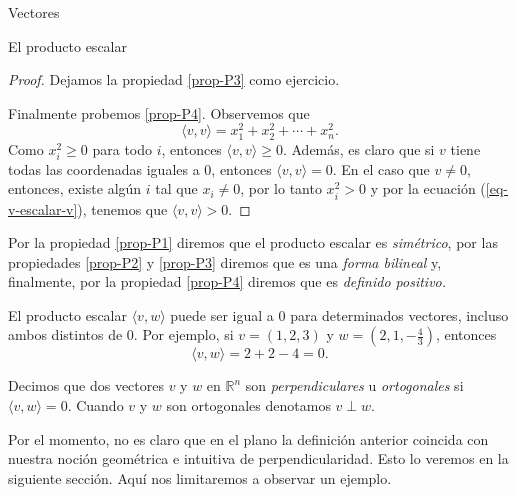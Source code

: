 \begin{chapter}{Vectores}
\begin{section}{El producto escalar}
\begin{proof}
        Dejamos la propiedad \ref{prop-P3} como ejercicio.
        
        Finalmente probemos \ref{prop-P4}. Observemos que 
        \begin{equation}\label{eq-v-escalar-v}
            \langle v , v \rangle = x_1^2 + x_2^2 + \cdots + x_n^2.
        \end{equation}
        Como $x_i^2 \ge 0$ para todo $i$,  entonces $\langle v , v \rangle \ge 0$. Además, es claro que si $v$ tiene todas las coordenadas iguales a 0,  entonces  $\langle v , v \rangle =0$. En  el caso que $v\not=0$, entonces,  existe algún $i$  tal que  $x_i \ne 0$, por lo tanto $x_i^2>0$ y por la ecuación (\ref{eq-v-escalar-v}), tenemos que  $\langle v , v \rangle>0$.
    \end{proof}

        Por  la propiedad \ref{prop-P1} diremos que el producto escalar es \textit{simétrico}, por las propiedades  \ref{prop-P2} y \ref{prop-P3} diremos que es una \textit{forma bilineal} y, finalmente, por la propiedad \ref{prop-P4} diremos que es \textit{definido positivo.} 
        
        El producto escalar $\langle v , w \rangle$ puede ser  igual a 0 para determinados  vectores,  incluso ambos distintos de 0.  Por ejemplo, si $v = (1,2,3)$ y $w = (2, 1, -\frac43)$,  entonces
        \begin{equation*}
            \langle v , w \rangle = 2 + 2 -4 =0.
        \end{equation*}
        \begin{definicion}
            Decimos que dos vectores $v$ y $w$ en $\mathbb R^n$ son  \textit{perpendiculares} u \textit{ortogonales} si  $\langle v , w \rangle=0$. Cuando $v$ y $w$ son ortogonales  denotamos $v \perp w$.
        \end{definicion}
        
        Por el momento, no es claro que en el plano la definición anterior coincida con nuestra noción geométrica e intuitiva de perpendicularidad. Esto lo veremos en la siguiente sección. Aquí nos limitaremos a observar un ejemplo.
        

\end{section}
\end{chapter}
